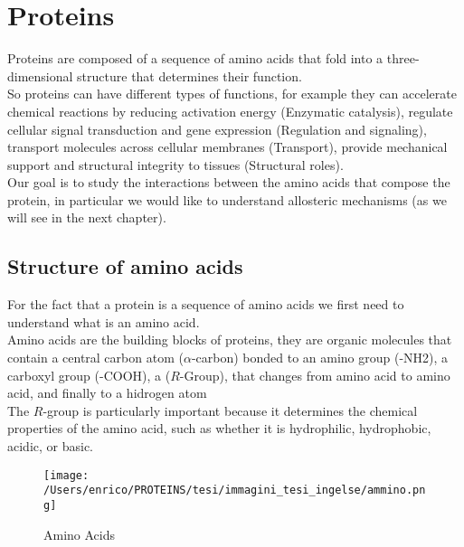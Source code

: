 \documentclass[English, Lau, oneside]{sapthesis}
\begin{document}
\chapter{Proteins}
\noindent Proteins are composed of a sequence of amino acids that fold into a three-dimensional structure that determines their function. \\
So proteins can have different types of functions, for example they can accelerate chemical reactions by reducing activation energy (Enzymatic catalysis), regulate cellular signal transduction and gene expression (Regulation and signaling), transport molecules across cellular membranes (Transport), provide mechanical support and structural integrity to tissues (Structural roles).\\
Our goal is to study the interactions between the amino acids that compose the protein, in particular we would like to understand allosteric mechanisms (as we will see in the next chapter).

\newpage
\section{Structure of amino acids}
\noindent For the fact that a protein is a sequence of amino acids we first need to understand what is an amino acid.\\
Amino acids are the building blocks of proteins, they are organic molecules that contain a central carbon atom (\(\alpha\)-carbon) bonded to an amino group (-NH2), a carboxyl group (-COOH), a (\(R\)-Group), that changes from amino acid to amino acid, and finally to a hidrogen atom\\
The \(R\)-group is particularly important because it determines the chemical properties of the amino acid, such as whether it is hydrophilic, hydrophobic, acidic, or basic.\\
\begin{figure}[H]
    \centering
    \texttt{[image: /Users/enrico/PROTEINS/tesi/immagini\_tesi\_ingelse/ammino.png]}
    \caption{Amino Acids}
\end{figure}
\newpage
\end{document}
